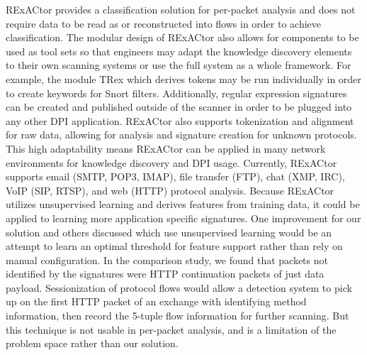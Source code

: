 RExACtor provides a classification solution for per-packet analysis and does not require data to be read as or reconstructed into flows in order to achieve classification. The modular design of RExACtor also allows for components to be used as tool sets so that engineers may adapt the knowledge discovery elements to their own scanning systems or use the full system as a whole framework. For example, the module TRex which derives tokens may be run individually in order to create keywords for Snort filters. Additionally, regular expression signatures can be created and published outside of the scanner in order to be plugged into any other DPI application. RExACtor also supports tokenization and alignment for raw data, allowing for analysis and signature creation for unknown protocols. This high adaptability means RExACtor can be applied in many network environments for knowledge discovery and DPI usage.
Currently, RExACtor supports email (SMTP, POP3, IMAP), file transfer (FTP), chat (XMP, IRC), VoIP (SIP, RTSP), and web (HTTP) protocol analysis. Because RExACtor utilizes unsupervised learning and derives features from training data, it could be applied to learning more application specific signatures. One improvement for our solution and others discussed which use unsupervised learning would be an attempt to learn an optimal threshold for feature support rather than rely on manual configuration. In the comparison study, we found that packets not identified by the signatures were HTTP continuation packets of just data payload. Sessionization of protocol flows would allow a detection system to pick up on the first HTTP packet of an exchange with identifying method information, then record the 5-tuple flow information for further scanning. But this technique is not usable in per-packet analysis, and is a limitation of the problem space rather than our solution.

